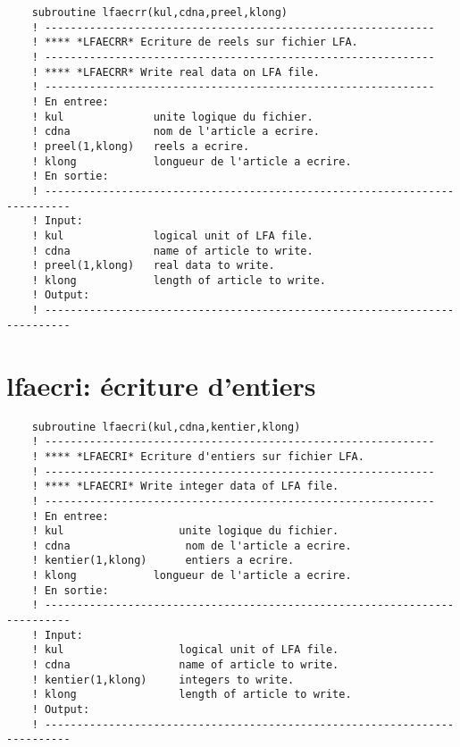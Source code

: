 \documentclass[10pt,french]{book}
\begin{document}
\begin{verbatim}
	subroutine lfaecrr(kul,cdna,preel,klong)
	! -------------------------------------------------------------                
	! **** *LFAECRR* Ecriture de reels sur fichier LFA.
	! -------------------------------------------------------------                
	! **** *LFAECRR* Write real data on LFA file.
	! -------------------------------------------------------------                
	! En entree:
	! kul              unite logique du fichier.
	! cdna             nom de l'article a ecrire.
	! preel(1,klong)   reels a ecrire.
	! klong            longueur de l'article a ecrire.
	! En sortie:
	! --------------------------------------------------------------------------
	! Input:
	! kul              logical unit of LFA file.
	! cdna             name of article to write.
	! preel(1,klong)   real data to write.
	! klong            length of article to write.
	! Output:
	! --------------------------------------------------------------------------
\end{verbatim}
\section{lfaecri: écriture d'entiers}
 
 
 
\begin{verbatim}
	subroutine lfaecri(kul,cdna,kentier,klong)
	! -------------------------------------------------------------                
	! **** *LFAECRI* Ecriture d'entiers sur fichier LFA.
	! -------------------------------------------------------------                
	! **** *LFAECRI* Write integer data of LFA file.
	! -------------------------------------------------------------                
	! En entree:
	! kul                  unite logique du fichier.
	! cdna                  nom de l'article a ecrire.
	! kentier(1,klong)      entiers a ecrire.
	! klong            longueur de l'article a ecrire.
	! En sortie:
	! --------------------------------------------------------------------------
	! Input:
	! kul                  logical unit of LFA file.
	! cdna                 name of article to write.
	! kentier(1,klong)     integers to write.
	! klong                length of article to write.
	! Output:
	! --------------------------------------------------------------------------
\end{verbatim}
\end{document}
